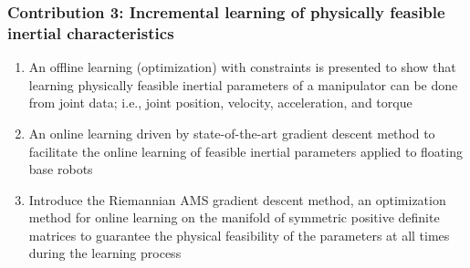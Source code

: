 \documentclass[12pt, a4paper]{article}
\begin{document}
\subsubsection*{Contribution 3: Incremental learning of physically feasible inertial characteristics}
\begin{enumerate}
	\item An offline learning (optimization) with constraints is presented to show that learning physically feasible inertial parameters of a manipulator can be done from joint data; i.e., joint position, velocity, acceleration, and torque
	\item An online learning driven by state-of-the-art gradient descent method to facilitate the online learning of feasible inertial parameters applied to floating base robots 
	\item Introduce the Riemannian AMS gradient descent method, an optimization method for online learning on the manifold of symmetric positive definite matrices to guarantee the physical feasibility of the parameters at all times during the learning process
\end{enumerate}
\end{document}
